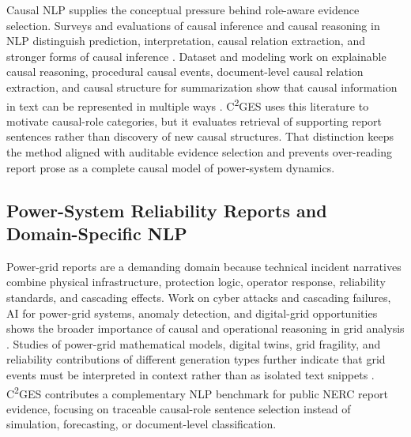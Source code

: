 \documentclass{article}
\begin{document}
Causal NLP supplies the conceptual pressure behind role-aware evidence selection. Surveys and evaluations of causal inference and causal reasoning in NLP distinguish prediction, interpretation, causal relation extraction, and stronger forms of causal inference \cite{feder2022causal,kcman2023causal,gao2023chatgpt,wang2024causalbench}. Dataset and modeling work on explainable causal reasoning, procedural causal events, document-level causal relation extraction, and causal structure for summarization show that causal information in text can be represented in multiple ways \cite{du2022ecare,zhang2023causal,wang2024documentlevel,chen2023inducing}. C\textsuperscript{2}GES uses this literature to motivate causal-role categories, but it evaluates retrieval of supporting report sentences rather than discovery of new causal structures. That distinction keeps the method aligned with auditable evidence selection and prevents over-reading report prose as a complete causal model of power-system dynamics.

\subsection{Power-System Reliability Reports and Domain-Specific NLP}
\label{sec:power_system_nlp}

Power-grid reports are a demanding domain because technical incident narratives combine physical infrastructure, protection logic, operator response, reliability standards, and cascading effects. Work on cyber attacks and cascading failures, AI for power-grid systems, anomaly detection, and digital-grid opportunities shows the broader importance of causal and operational reasoning in grid analysis \cite{rajkumar2023cyber,sahani2023machine,madabhushi2023survey,xie2022massively}. Studies of power-grid mathematical models, digital twins, grid fragility, and reliability contributions of different generation types further indicate that grid events must be interpreted in context rather than as isolated text snippets \cite{srinivasan2023artificial,ranawaka2024leveraging,karagiannakis2024fragility,ramirezmeyers2021different}. C\textsuperscript{2}GES contributes a complementary NLP benchmark for public NERC report evidence, focusing on traceable causal-role sentence selection instead of simulation, forecasting, or document-level classification.
\end{document}
